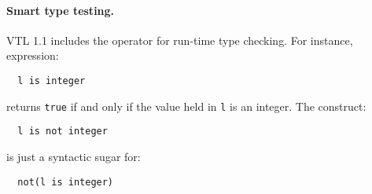 \documentclass[droidmono,libertine,twoside,user,unofficial]{ecarticle}
\def\<#1>{\synt{#1}}
\begin{document}






\paragraph{Smart type testing.}

VTL 1.1 includes the operator  for run-time type checking.
For instance, expression:
\begin{lstlisting}
  l is integer
\end{lstlisting}
returns \texttt{true} if and only if the value held in \texttt{l} is
an integer.  The construct:
\begin{lstlisting}
  l is not integer
\end{lstlisting}
is just a syntactic sugar for:
\begin{lstlisting}
  not(l is integer)
\end{lstlisting}
\end{document}
